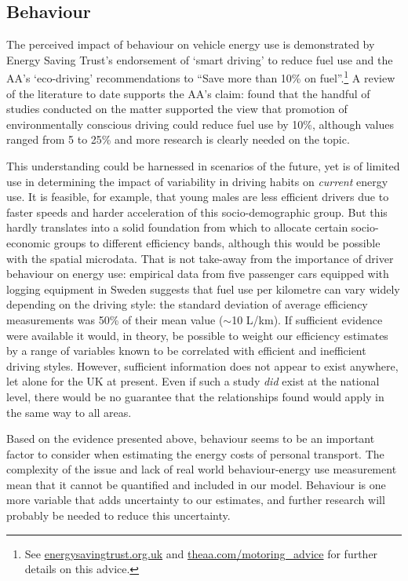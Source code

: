 \subsection{Behaviour}
The perceived impact of behaviour on vehicle energy use is demonstrated
by Energy Saving Trust's endorsement of `smart driving' to reduce fuel use
 and the AA's `eco-driving' recommendations to ``Save more than 10\% on
 fuel''.\footnote{See
 \href{http://www.energysavingtrust.org.uk/Travel/Driving}{energysavingtrust.org.uk}
and \href{http://www.theaa.com/motoring_advice/fuels-and-environment/drive-smart.html}
{theaa.com/motoring\_advice}
for further details on this advice.
}
A review of the literature to date supports the AA's claim:
\citet{Barkenbus2010} found that the handful of studies conducted
on the matter supported the view that promotion of environmentally conscious
driving could reduce fuel use by 10\%, although values ranged from 5 to 25\%
and more research is clearly needed on the topic.

This understanding could be harnessed in scenarios of the future, yet is of limited
use in determining the impact of variability in driving habits on \emph{current}
energy use. It is feasible, for example, that young males are less efficient drivers
due to faster speeds \citep{fleiter2007choosing} and harder acceleration
of this socio-demographic group. But this hardly translates into a
solid foundation from which to allocate certain socio-economic groups
to different efficiency bands, although this would be possible with the
spatial microdata. That is not take-away from the importance of driver
behaviour on energy use: 
empirical data from five passenger cars equipped with
logging equipment in Sweden \citep{Ericsson2001a} suggests that
fuel use per kilometre can vary widely depending on the driving style:
the standard deviation of average efficiency measurements was 50\%
of their mean value ($\sim$10 L/km). If sufficient evidence were available
it would, in theory, be possible to weight our efficiency estimates
by a range of variables known to be correlated with efficient and
inefficient driving styles. However, sufficient information does
not appear to exist anywhere, let alone for the UK at present.
Even if such a study \emph{did} exist at the national level,
there would be no guarantee that the relationships found would apply in the
same way to all areas.

Based on the evidence presented above, behaviour seems to be an important factor
to consider when estimating the energy costs of personal transport.
The complexity of the issue and lack of real world behaviour-energy use
measurement mean that it cannot be quantified and included in our model.
Behaviour is one more variable that adds uncertainty to our estimates,
and further research will probably be needed to reduce this uncertainty.

